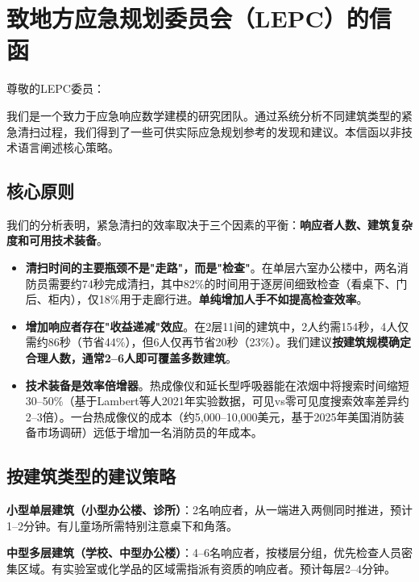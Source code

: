 \documentclass[12pt,a4paper]{ctexart}
\begin{document}
\section*{致地方应急规划委员会（LEPC）的信函}
{\small

\vspace{6pt}
\noindent 尊敬的LEPC委员：

\vspace{6pt}

我们是一个致力于应急响应数学建模的研究团队。通过系统分析不同建筑类型的紧急清扫过程，我们得到了一些可供实际应急规划参考的发现和建议。本信函以非技术语言阐述核心策略。

\subsection*{核心原则}

我们的分析表明，紧急清扫的效率取决于三个因素的平衡：\textbf{响应者人数、建筑复杂度和可用技术装备}。

\begin{itemize}
    \item \textbf{清扫时间的主要瓶颈不是"走路"，而是"检查"}。在单层六室办公楼中，两名消防员需要约74秒完成清扫，其中82\%的时间用于逐房间细致检查（看桌下、门后、柜内），仅18\%用于走廊行进。\textbf{单纯增加人手不如提高检查效率}。
    \item \textbf{增加响应者存在"收益递减"效应}。在2层11间的建筑中，2人约需154秒，4人仅需约86秒（节省44\%），但6人仅再节省20秒（23\%）。我们建议\textbf{按建筑规模确定合理人数，通常2--6人即可覆盖多数建筑}。
    \item \textbf{技术装备是效率倍增器}。热成像仪和延长型呼吸器能在浓烟中将搜索时间缩短30--50\%（基于Lambert等人2021年实验数据，可见vs零可见度搜索效率差异约2--3倍）。一台热成像仪的成本（约5,000--10,000美元，基于2025年美国消防装备市场调研）远低于增加一名消防员的年成本。
\end{itemize}

\subsection*{按建筑类型的建议策略}

\textbf{小型单层建筑（小型办公楼、诊所）}：2名响应者，从一端进入两侧同时推进，预计1--2分钟。有儿童场所需特别注意桌下和角落。

\textbf{中型多层建筑（学校、中型办公楼）}：4--6名响应者，按楼层分组，优先检查人员密集区域。有实验室或化学品的区域需指派有资质的响应者。预计每层2--4分钟。

}
\end{document}
